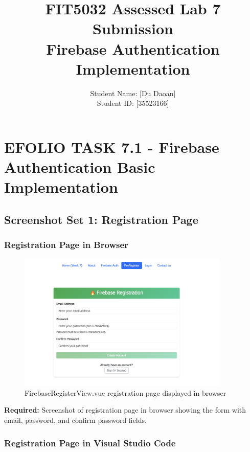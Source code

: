 \documentclass[11pt,a4paper]{article}
\title{\textbf{FIT5032 Assessed Lab 7 Submission\\Firebase Authentication Implementation}}
\author{Student Name: [Du Daoan]\\Student ID: [35523166]}
\date{}
\begin{document}
\maketitle



\section{EFOLIO TASK 7.1 - Firebase Authentication Basic Implementation}

\subsection{Screenshot Set 1: Registration Page}

\subsubsection{Registration Page in Browser}

\begin{figure}[H]
     \centering
     \includegraphics[width=0.9\textwidth]{registration_browser.png}
     \caption{FirebaseRegisterView.vue registration page displayed in browser}
     \label{fig:reg_browser}
 \end{figure}

\textbf{Required:} Screenshot of registration page in browser showing the form with email, password, and confirm password fields.

\subsubsection{Registration Page in Visual Studio Code}
\end{document}
